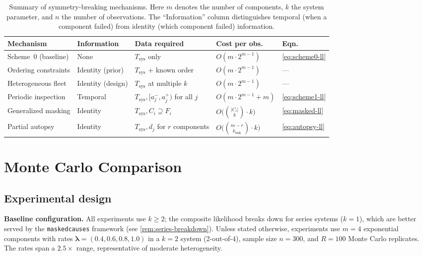 \documentclass[12pt]{article}
\newcommand{\Tsys}{T_{\mathrm{sys}}}
\newcommand{\blambda}{\boldsymbol{\lambda}}
\begin{document}
\begin{table}[t]
\centering
\caption{Summary of symmetry-breaking mechanisms.  Here $m$ denotes the
  number of components, $k$ the system parameter, and $n$ the number of
  observations.  The ``Information'' column distinguishes temporal
  (when a component failed) from identity (which component failed)
  information.}\label{tab:mechanisms}
\small
\begin{tabular}{@{}lllll@{}}
\toprule
Mechanism & Information & Data required & Cost per obs.\ &
  Eqn.\ \\
\midrule
Scheme~0 (baseline) & None & $\Tsys$ only &
  $O(m \cdot 2^{m-1})$ & \eqref{eq:scheme0-ll} \\
Ordering constraints & Identity (prior) & $\Tsys$ + known order &
  $O(m \cdot 2^{m-1})$ & --- \\
Heterogeneous fleet & Identity (design) & $\Tsys$ at multiple $k$ &
  $O(m \cdot 2^{m-1})$ & --- \\
Periodic inspection & Temporal & $\Tsys, [a_j^-,a_j^+)$ for all $j$ &
  $O(m \cdot 2^{m-1} + m)$ & \eqref{eq:scheme1-ll} \\
Generalized masking & Identity & $\Tsys, C_i \supseteq F_i$ &
  $O\bigl(\binom{|C_i|}{k} \cdot k\bigr)$ & \eqref{eq:masked-ll} \\
Partial autopsy & Identity & $\Tsys, d_j$ for $r$ components &
  $O\bigl(\binom{m-r}{k_\text{unk}} \cdot k\bigr)$ &
  \eqref{eq:autopsy-ll} \\
\bottomrule
\end{tabular}
\end{table}


\section{Monte Carlo Comparison}\label{sec:monte-carlo}

\subsection{Experimental design}\label{sec:design}

\textbf{Baseline configuration.}
All experiments use $k \geq 2$; the composite likelihood breaks down
for series systems ($k = 1$), which are better served by the
\texttt{maskedcauses} framework (see \cref{rem:series-breakdown}).
Unless stated otherwise, experiments use $m = 4$ exponential components
with rates $\blambda = (0.4, 0.6, 0.8, 1.0)$ in a $k = 2$ system
(2-out-of-4), sample size $n = 300$, and $R = 100$ Monte Carlo replicates.
The rates span a $2.5\times$ range, representative of moderate
heterogeneity.
\end{document}
